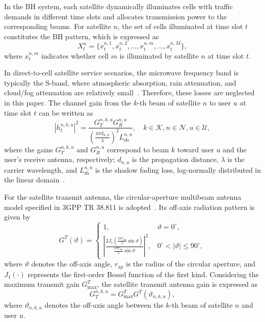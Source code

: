 \documentclass[journal]{IEEEtran}
\begin{document}
In the BH system, each satellite dynamically illuminates cells with traffic demands in different time slots and allocates transmission power to the corresponding beams. For satellite $n$, the set of cells illuminated at time slot $t$ constitutes the BH pattern, which is expressed as
\begin{equation}
X_t^n=
\{x_t^{n,1},x_t^{n,2},\ldots,x_t^{n,m},\ldots,x_t^{n,M}\},
\end{equation}
where $x_t^{n,m}$ indicates whether cell $m$ is illuminated by satellite $n$ at time slot $t$.

In direct-to-cell satellite service scenarios, the microwave frequency band is typically the S-band, where atmospheric absorption, rain attenuation, and cloud/fog attenuation are relatively small~\cite{ref24,ref25,ref26}. Therefore, these losses are neglected in this paper. The channel gain from the $k$-th beam of satellite $n$ to user $u$ at time slot $t$ can be written as
\begin{equation}
|h_t^{n,k,u}|^2
=
\frac{
G_T^{n,k,u}G_R^{n,u}
}{
\left(\frac{4\pi d_{n,u}}{\lambda}\right)^2
L_{\mathrm{sh}}^{n,u}
},
\quad
k\in\mathcal{K}, n\in\mathcal{N}, u\in\mathcal{U},
\end{equation}
where the gains $G_T^{n,k,u}$ and $G_R^{n,u}$ correspond to beam $k$ toward user $u$ and the user's receive antenna, respectively; $d_{n,u}$ is the propagation distance, $\lambda$ is the carrier wavelength, and $L_{\mathrm{sh}}^{n,u}$ is the shadow fading loss, log-normally distributed in the linear domain~\cite{ref27}.

For the satellite transmit antenna, the circular-aperture multibeam antenna model specified in 3GPP TR 38.811 is adopted~\cite{ref28}. Its off-axis radiation pattern is given by
\begin{equation}
G^T(\vartheta)=
\begin{cases}
1, & \vartheta=0^\circ,\\
\left|
\frac{
2J_1\left(\frac{2\pi r_{\mathrm{ap}}}{\lambda}\sin\vartheta\right)
}{
\frac{2\pi r_{\mathrm{ap}}}{\lambda}\sin\vartheta
}
\right|^2,
& 0^\circ<|\vartheta|\leq90^\circ,
\end{cases}
\end{equation}
where $\vartheta$ denotes the off-axis angle, $r_{\mathrm{ap}}$ is the radius of the circular aperture, and $J_1(\cdot)$ represents the first-order Bessel function of the first kind. Considering the maximum transmit gain $G_{\max}^T$, the satellite transmit antenna gain is expressed as
\begin{equation}
G_T^{n,k,u}
=
G_{\max}^T G^T(\vartheta_{n,k,u}),
\end{equation}
where $\vartheta_{n,k,u}$ denotes the off-axis angle between the $k$-th beam of satellite $n$ and user $u$.
\end{document}
